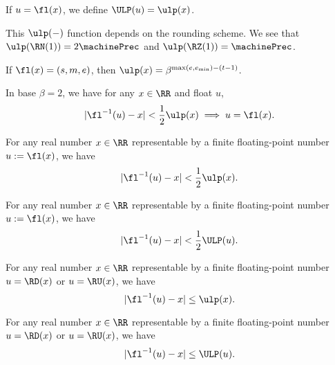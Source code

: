 \begin{defn}
  If $u=\fl(x)$, we define $\ULP(u)=\ulp(x)$.
\end{defn}


\begin{ex}
  This $\ulp(-)$ function depends on the rounding scheme.
  We see that $\ulp(\RN(1)) = 2\machinePrec$ and $\ulp(\RZ(1))=\machinePrec$.
\end{ex}


\begin{thm}
  If $\fl(x)=(s,m,e)$, then $\ulp(x) = \beta^{\max(e,e_{\text{min}})-(t-1)}$.
\end{thm}


\begin{thm}
  In base $\beta=2$, we have for any $x\in\RR$ and float $u$,
  \begin{equation*}
    |\fl^{-1}(u)-x| < \frac{1}{2}\ulp(x)\implies u = \fl(x).
  \end{equation*}
\end{thm}


\begin{thm}
  For any real number $x\in\RR$ representable by a finite floating-point
  number $u:=\fl(x)$, we have
  \begin{equation*}
    |\fl^{-1}(u)-x| < \frac{1}{2}\ulp(x).
  \end{equation*}
\end{thm}


\begin{thm}
  For any real number $x\in\RR$ representable by a finite floating-point
  number $u:=\fl(x)$, we have
  \begin{equation*}
    |\fl^{-1}(u)-x| < \frac{1}{2}\ULP(u).
  \end{equation*}
\end{thm}


\begin{thm}
  For any real number $x\in\RR$ representable by a finite floating-point
  number $u=\RD(x)$ or $u=\RU(x)$, we have
  \begin{equation*}
    |\fl^{-1}(u)-x|\leq\ulp(x).
  \end{equation*}
\end{thm}


\begin{thm}
  For any real number $x\in\RR$ representable by a finite floating-point
  number $u=\RD(x)$ or $u=\RU(x)$, we have
  \begin{equation*}
    |\fl^{-1}(u)-x|\leq\ULP(u).
  \end{equation*}
\end{thm}

